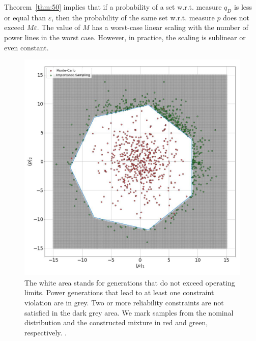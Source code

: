 Theorem~\ref{thm:50} implies that if a probability of a set w.r.t. measure $q_D$ is less or equal than $\varepsilon$, then the probability of the same set w.r.t. measure $p$ does not exceed $M\varepsilon$. %
The value of $M$ has a worst-case linear scaling with the number of power lines in the worst case. However, in practice, the scaling is sublinear or even constant.

\begin{figure}[!t]
  \centering

  \includegraphics[width=.4\textwidth]{Dissertation/images/dc_stochastic_approx/conditioned_vs_MC (1).jpg}
  \caption{The white area stands for generations that do not exceed operating limits. Power generations that lead to at least one constraint violation are in grey. Two or more reliability constraints are not satisfied in the dark grey area. We mark samples from the nominal distribution and the constructed mixture in red and green, respectively. \cite{lukashevich2021power}.}
  \label{fig:conv_vs_MC}
  
\end{figure}

